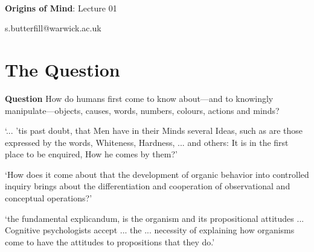 \documentclass[12pt]{extarticle}
\date{}
\makeatletter
\def \ititle {Origins of Mind}
\def \isubtitle {Lecture 01}
\def \iemail{s.butterfill@warwick.ac.uk}
\makeatother
\begin{document}
\begin{multicols}{3}

\setlength\footnotesep{1em}







\def \ititle {Origins of Mind}
 
\def \isubtitle {Lecture 01}
 
 
 
\
 
 
 
\begin{center}
 
{\Large
 
\textbf{\ititle}: \isubtitle
 
}
 
 
 
\iemail %
 
\end{center}
 
 
 
\section{The Question}
 
\textbf{Question}
How do humans first come to know about---and to knowingly manipulate---objects, causes, words, numbers, colours, actions and minds?
 
‘... ’tis past doubt, that Men have in their Minds several Ideas, such as are those expressed by the words, Whiteness, Hardness, ... and others: It is in the first place to be enquired, How he comes by them?’
\citep[p.\ 104]{Locke:1975qo}
 
‘How does it come about that the development of organic behavior into controlled inquiry brings about the differentiation and cooperation of observational and conceptual operations?’
\citep[p.\ 12]{Dewey:1938yp}
 
‘the fundamental explicandum, is the organism and its propositional attitudes ... Cognitive psychologists accept ... the ... necessity of explaining how organisms come to have the attitudes to propositions that they do.’
\citep[p.\ 198]{Fodor:1975pb}
 
 
 

\end{multicols}
\end{document}

